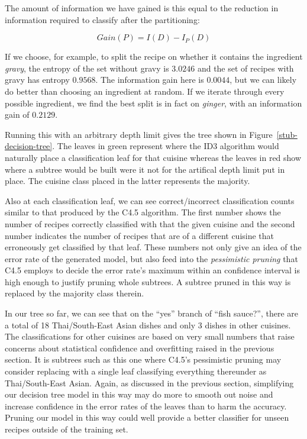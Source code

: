 \documentclass[11pt,a4paper]{article}
\begin{document}
The amount of information we have gained is this equal to the reduction in
information required to classify after the partitioning:

\begin{equation}
  Gain(P) = I(D) - I_P(D)
\end{equation}

If we choose, for example, to split the recipe on whether it contains the
ingredient \emph{gravy}, the entropy of the set without gravy is $3.0246$
and the set of recipes with gravy has entropy $0.9568$. The information
gain here is $0.0044$, but we can likely do better than choosing an
ingredient at random. If we iterate through every possible ingredient, we
find the best split is in fact on \emph{ginger}, with an information gain
of $0.2129$.

Running this with an arbitrary depth limit gives the tree shown in
Figure~\ref{stub-decision-tree}. The leaves in green represent where
the ID3 algorithm would naturally place a classification leaf for that
cuisine whereas the leaves in red show where a subtree would be built
were it not for the artifical depth limit put in place. The cuisine
class placed in the latter represents the majority.

Also at each classification leaf, we can
see correct/incorrect classification counts similar to that produced
by the C4.5 algorithm. The first number shows the number of recipes
correctly classified with that the given cuisine and the second number
indicates the number of recipes that are of a different cuisine that
erroneously get classified by that leaf. These numbers not only give
an idea of the error rate of the generated model, but also feed into the
\emph{pessimistic pruning} \cite{karimi2000logical} that C4.5 employs
to decide the error rate's maximum within an confidence interval is
high enough to justify pruning whole subtrees. A subtree pruned in this
way is replaced by the majority class therein.

In our tree so far, we can see that on the ``yes'' branch of ``fish sauce?'',
there are a total of 18 Thai/South-East Asian dishes and only 3 dishes
in other cuisines. The classifications for other cuisines are based on
very small numbers that raise concerns about statistical confidence and
overfitting raised in the previous section. It is subtrees such as
this one where C4.5's pessimistic pruning may consider replacing
with a single leaf classifying everything thereunder as Thai/South-East Asian.
Again, as discussed in the previous section, simplifying our decision tree
model in this way may do more to smooth out noise and increase confidence in the
error rates of the leaves than to harm the accuracy. Pruning our
model in this way could well provide a better classifier for unseen recipes outside
of the training set.
\end{document}
